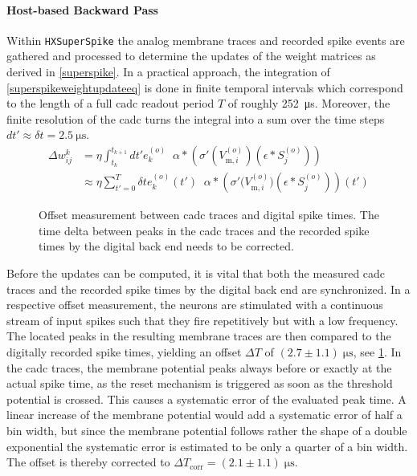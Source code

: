 \paragraph{Host-based Backward Pass}
Within \texttt{HXSuperSpike} the analog membrane traces and recorded spike events are gathered and processed to determine the updates of the weight matrices as derived in \cref{superspike}. In a practical approach, the integration of \cref{superspikeweightupdateeq} is done in finite temporal intervals which correspond to the length of a full \gls{cadc} readout period $T$ of roughly \SI{252}{\micro \s}. Moreover, the finite resolution of the \gls{cadc} turns the integral into a sum over the time steps $dt'  \approx \delta t = \SI{2.5}{\micro \s}$.
\begin{align}
\Delta w^k_{ij} &= \eta \int_{t_k}^{t_{k+1}} dt'
e^{(o)}_k \; \; \alpha \ast 
\left( \sigma'(V^{(o)}_{\text{m},i}) \left(\epsilon \ast S^{(o)}_j\right) \right) \nonumber \\
&\approx \eta \sum_{t'=0}^{T} \delta t e^{(o)}_k(t') \; \; \alpha \ast 
\left( \sigma'\big(V^{(o)}_{\text{m},i}\big) \left(\epsilon \ast S^{(o)}_j\right)\right)(t')
\label{superspikeweightupdatedivided}
\end{align}

\begin{figure}
	\centering
	\vspace{-.75cm}
	
	\vspace{-.15cm}
	\caption[Offset measurement between \acrshort{cadc} traces and digital spike times.]{Offset measurement between \acrshort{cadc} traces and digital spike times. The time delta between peaks in the \acrshort{cadc} traces and the recorded spike times by the digital back end needs to be corrected.} 
	\label{cadcppuoffset}
	\vspace{-.75cm}
\end{figure}

Before the updates can be computed, it is vital that both the measured \acrshort{cadc} traces and the recorded spike times by the digital back end are synchronized. In a respective offset measurement, the neurons are stimulated with a continuous stream of input spikes such that they fire repetitively but with a low frequency. The located peaks in the resulting membrane traces are then compared to the digitally recorded spike times, yielding an offset $\Delta T$ of $(2.7 \pm 1.1)\; \si{\micro\s}$, see \cref{cadcppuoffset}. In the \gls{cadc} traces, the membrane potential peaks always before or exactly at the actual spike time, as the reset mechanism is triggered as soon as the threshold potential is crossed. This causes a systematic error of the evaluated peak time. A linear increase of the membrane potential would add a systematic error of half a bin width, but since the membrane potential follows rather the shape of a double exponential the systematic error is estimated to be only a quarter of a bin width. The offset is thereby corrected to $\Delta T_\text{corr} = (2.1 \pm 1.1)\; \si{\micro\s}$.

